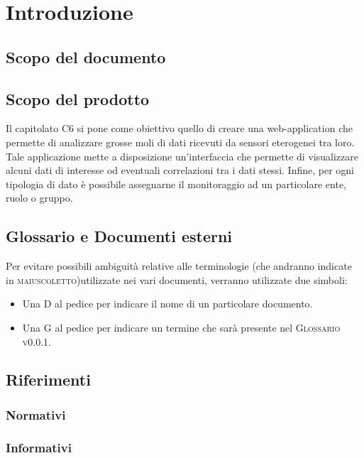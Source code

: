 \section{Introduzione}
	\subsection{Scopo del documento}
		
	\subsection{Scopo del prodotto}
		Il capitolato C6 si pone come obiettivo quello di creare una web-application che permette di analizzare grosse moli di dati ricevuti da sensori eterogenei tra loro. Tale applicazione mette a disposizione un'interfaccia che permette di visualizzare alcuni dati di interesse od eventuali correlazioni tra i dati stessi. Infine, per ogni tipologia di dato è possibile assegnarne il monitoraggio ad un particolare ente, ruolo o gruppo.
	\subsection{Glossario e Documenti esterni}
		Per evitare possibili ambiguità relative alle terminologie (che andranno indicate in \textsc{maiuscoletto})utilizzate nei vari documenti, verranno utilizzate due simboli:
		\begin{itemize}
			\item Una \textsc{D} al pedice per indicare il nome di un particolare documento.
			\item Una \textsc{G} al pedice per indicare un termine che sarà presente nel \textsc{Glossario v0.0.1}.
		\end{itemize}
	\subsection{Riferimenti}
		\subsubsection{Normativi}
			
		\subsubsection{Informativi}
			
 
